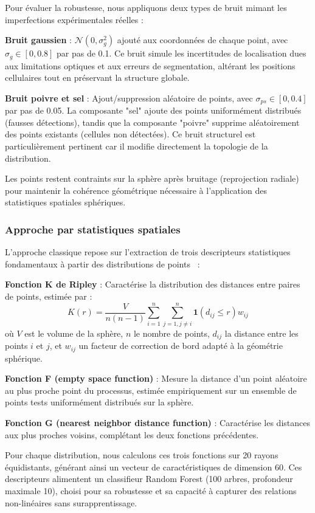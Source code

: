 Pour évaluer la robustesse, nous appliquons deux types de bruit mimant les imperfections expérimentales réelles :

\textbf{Bruit gaussien} : $\mathcal{N}(0, \sigma_g^2)$ ajouté aux coordonnées de chaque point, avec $\sigma_g \in [0, 0.8]$ par pas de 0.1. Ce bruit simule les incertitudes de localisation dues aux limitations optiques et aux erreurs de segmentation, altérant les positions cellulaires tout en préservant la structure globale.

\textbf{Bruit poivre et sel} : Ajout/suppression aléatoire de points, avec $\sigma_{ps} \in [0, 0.4]$ par pas de 0.05. La composante "sel" ajoute des points uniformément distribués (fausses détections), tandis que la composante "poivre" supprime aléatoirement des points existants (cellules non détectées). Ce bruit structurel est particulièrement pertinent car il modifie directement la topologie de la distribution.

Les points restent contraints sur la sphère après bruitage (reprojection radiale) pour maintenir la cohérence géométrique nécessaire à l'application des statistiques spatiales sphériques.

\subsubsection{Approche par statistiques spatiales}

L'approche classique repose sur l'extraction de trois descripteurs statistiques fondamentaux à partir des distributions de points~\cite{baddeley2000practical} :

\textbf{Fonction K de Ripley} : Caractérise la distribution des distances entre paires de points, estimée par :
\[
\hat{K}(r) = \frac{V}{n(n-1)}\sum_{i=1}^{n}\sum_{j=1,j\neq i}^{n} \mathbf{1}(d_{ij} \leq r)w_{ij}
\]
où $V$ est le volume de la sphère, $n$ le nombre de points, $d_{ij}$ la distance entre les points $i$ et $j$, et $w_{ij}$ un facteur de correction de bord adapté à la géométrie sphérique.

\textbf{Fonction F (empty space function)} : Mesure la distance d'un point aléatoire au plus proche point du processus, estimée empiriquement sur un ensemble de points tests uniformément distribués sur la sphère.

\textbf{Fonction G (nearest neighbor distance function)} : Caractérise les distances aux plus proches voisins, complétant les deux fonctions précédentes.

Pour chaque distribution, nous calculons ces trois fonctions sur 20 rayons équidistants, générant ainsi un vecteur de caractéristiques de dimension 60. Ces descripteurs alimentent un classifieur Random Forest (100 arbres, profondeur maximale 10), choisi pour sa robustesse et sa capacité à capturer des relations non-linéaires sans surapprentissage.

